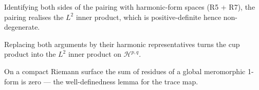 \begin{lemma}
\label{lem:serre-pairing-nondegenerate}
Identifying both sides of the pairing with harmonic-form spaces (R5 + R7), the pairing realises the $L^{2}$ inner product, which is positive-definite hence non-degenerate.
\leanok
\end{lemma}

\begin{lemma}
\label{lem:serre-l2-realisation}
Replacing both arguments by their harmonic representatives turns the cup product into the $L^{2}$ inner product on $\mathcal{H}^{p,q}$.
\leanok
\end{lemma}

\begin{lemma}
\label{lem:serre-residue-theorem}
On a compact Riemann surface the sum of residues of a global meromorphic 1-form is zero --- the well-definedness lemma for the trace map.
\leanok
\end{lemma}

